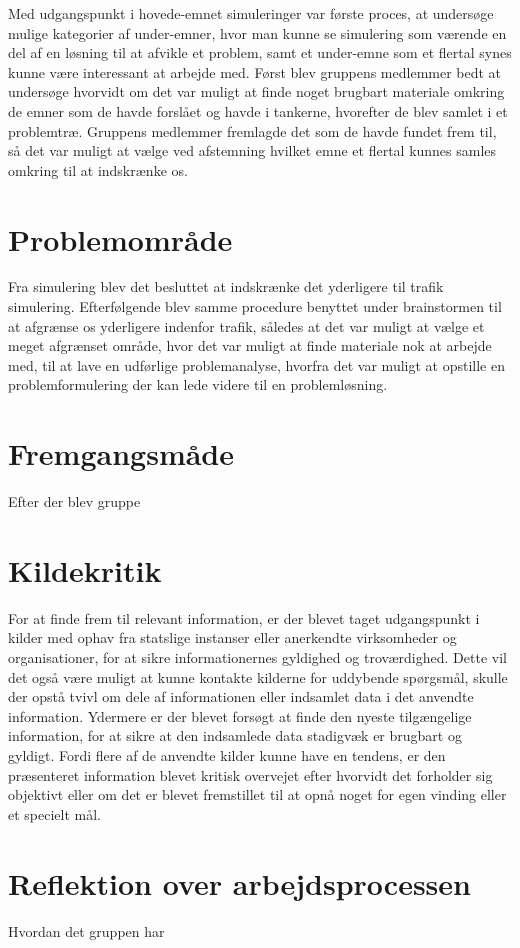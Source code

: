 Med udgangspunkt i hovede-emnet simuleringer var første proces, at undersøge mulige kategorier af under-emner, hvor man kunne se simulering som værende en del af en løsning til at afvikle et problem, samt et under-emne som et flertal synes kunne være interessant at arbejde med. Først blev gruppens medlemmer bedt at undersøge hvorvidt om det var muligt at finde noget brugbart materiale omkring de emner som de havde forslået og havde i tankerne, hvorefter de blev samlet i et problemtræ. Gruppens medlemmer fremlagde det som de havde fundet frem til, så det var muligt at vælge ved afstemning hvilket emne et flertal kunnes samles omkring til at indskrænke os.

\section{Problemområde}

Fra simulering blev det besluttet at indskrænke det yderligere til trafik simulering. Efterfølgende blev samme procedure benyttet under brainstormen til at afgrænse os yderligere indenfor trafik, således at det var muligt at vælge et meget afgrænset område, hvor det var muligt at finde materiale nok at arbejde med, til at lave en udførlige problemanalyse, hvorfra det var muligt at opstille en problemformulering der kan lede videre til en problemløsning. 

\section{Fremgangsmåde}

Efter der blev gruppe

\section{Kildekritik}
For at finde frem til relevant information, er der blevet taget udgangspunkt i kilder med ophav fra statslige instanser eller anerkendte virksomheder og organisationer, for at sikre informationernes gyldighed og troværdighed. Dette vil det også være muligt at kunne kontakte kilderne for uddybende spørgsmål, skulle der opstå tvivl om dele af informationen eller indsamlet data i det anvendte information. Ydermere er der blevet forsøgt at finde den nyeste tilgængelige information, for at sikre at den indsamlede data stadigvæk er brugbart og gyldigt. Fordi flere af de anvendte kilder kunne have en tendens, er den præsenteret information blevet kritisk overvejet efter hvorvidt det forholder sig objektivt eller om det er blevet fremstillet til at opnå noget for egen vinding eller et specielt mål.

\section{Reflektion over arbejdsprocessen}\label{Reflektion-over-arbejdsprocessen}
Hvordan det gruppen har 